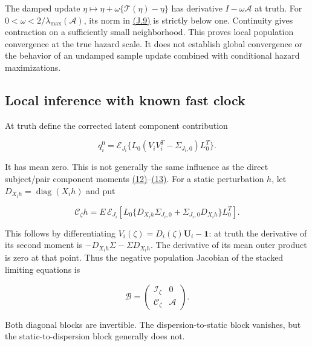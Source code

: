 \documentclass[11pt]{article}
\begin{document}
The damped update \(\eta\mapsto\eta+\omega\{\mathcal T(\eta)-\eta\}\) has derivative \(I-\omega\mathcal A\) at truth. For
\(0<\omega<2/\lambda_{\max}(\mathcal A)\), its norm in \hyperref[eq:J.9]{(J.9)} is strictly below one. Continuity gives contraction on a sufficiently small neighborhood. This proves local population convergence at the true hazard scale. It does not establish global convergence or the behavior of an undamped sample update combined with conditional hazard maximizations.

\subsection{Local inference with known fast clock}\label{sec:J.3}

At truth define the corrected latent component contribution

\begin{equation*}
q_i^0=\mathcal E_{J_i}\{L_0(V_iV_i^T-\Sigma_{J_i,0})L_0^T\}.
\tag{J.11}\label{eq:J.11}
\end{equation*}

It has mean zero. This is not generally the same influence as the direct subject/pair component moments \hyperref[eq:12]{(12)}--\hyperref[eq:13]{(13)}. For a static perturbation \(h\), let \(D_{X_ih}=\operatorname{diag}(X_ih)\) and put

\begin{equation*}
\mathcal C_\zeta h=E\,\mathcal E_{J_i}\!
 \left[L_0\{D_{X_ih}\Sigma_{J_i,0}+\Sigma_{J_i,0}D_{X_ih}\}L_0^T\right].
\tag{J.12}\label{eq:J.12}
\end{equation*}

This follows by differentiating \(V_i(\zeta)=D_i(\zeta)\mathbf U_i-\mathbf1\): at truth the derivative of its second moment is
\(-D_{X_ih}\Sigma-\Sigma D_{X_ih}\). The derivative of its mean outer product is zero at that point. Thus the negative population Jacobian of the stacked limiting equations is

\begin{equation*}
\mathcal B=\begin{pmatrix}\mathcal I_\zeta&0\\
\mathcal C_\zeta&\mathcal A\end{pmatrix}.
\tag{J.13}\label{eq:J.13}
\end{equation*}

Both diagonal blocks are invertible. The dispersion-to-static block vanishes, but the static-to-dispersion block generally does not.
\end{document}

